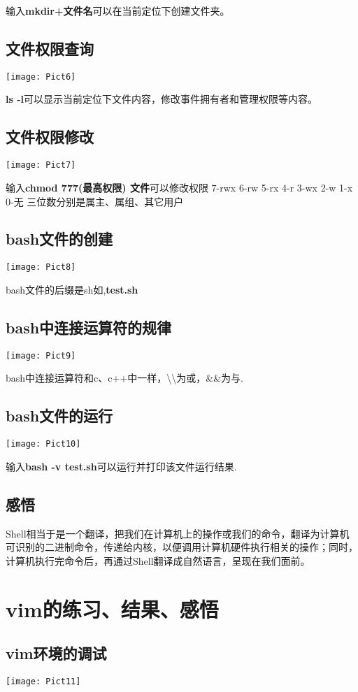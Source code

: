 \documentclass[a4paper, 12pt]{article}
\begin{document}
输入\textbf{mkdir+文件名}可以在当前定位下创建文件夹。
\subsection{\small 文件权限查询}
\texttt{[image: Pict6]}

\textbf{ls -l}可以显示当前定位下文件内容，修改事件拥有者和管理权限等内容。  

\subsection{\small 文件权限修改}
\texttt{[image: Pict7]}

输入\textbf{chmod 777(最高权限) 文件}可以修改权限
7-rwx 6-rw 5-rx 4-r 3-wx 2-w 1-x 0-无
三位数分别是属主、属组、其它用户 
\subsection{\small bash文件的创建}
\texttt{[image: Pict8]}

bash文件的后缀是sh如,\textbf{test.sh}
\subsection{\small bash中连接运算符的规律}
\texttt{[image: Pict9]}

bash中连接运算符和c、c++中一样，\textbackslash \textbackslash 为或，\&\&为与.
\subsection{\small bash文件的运行}
\texttt{[image: Pict10]}

输入\textbf{bash -v test.sh}可以运行并打印该文件运行结果.
\subsection{\small 感悟}
Shell相当于是一个翻译，把我们在计算机上的操作或我们的命令，翻译为计算机可识别的二进制命令，传递给内核，以便调用计算机硬件执行相关的操作；同时，计算机执行完命令后，再通过Shell翻译成自然语言，呈现在我们面前。
\section{\large vim的练习、结果、感悟}
\subsection{\small vim环境的调试}
\texttt{[image: Pict11]}
\end{document}
